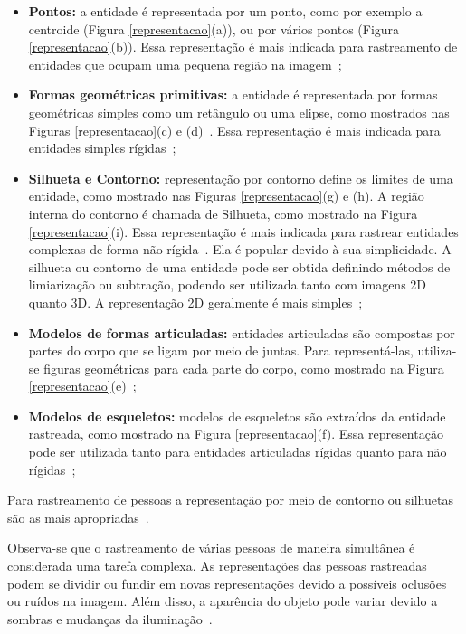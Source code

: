 	\begin{itemize}
		\item \textbf{Pontos:} a entidade é representada por um ponto, como por exemplo a centroide (Figura \ref{representacao}(a)), ou por vários pontos (Figura \ref{representacao}(b)). Essa representação é mais indicada para rastreamento de entidades que ocupam uma pequena região na imagem~\cite{yilmaz};

		\item \textbf{Formas geométricas primitivas:} a entidade é representada por formas geométricas simples como um retângulo ou uma elipse, como mostrados nas Figuras \ref{representacao}(c) e (d)~\cite{comaniciu}. Essa representação é mais indicada para entidades simples rígidas~\cite{yilmaz};

		\item \textbf{Silhueta e Contorno:} representação por contorno define os limites de uma entidade, como mostrado nas Figuras \ref{representacao}(g) e (h). A região interna do contorno é chamada de Silhueta, como mostrado na Figura \ref{representacao}(i). Essa representação é mais indicada para rastrear entidades complexas de forma não rígida~\cite{yilmaz, yilmaz2}. Ela é popular devido à sua simplicidade. A silhueta ou contorno de uma entidade pode ser obtida definindo métodos de limiarização ou subtração, podendo ser utilizada tanto com imagens 2D quanto 3D. A representação 2D geralmente é mais simples~\cite{moeslund};

		\item \textbf{Modelos de formas articuladas:} entidades articuladas são compostas por partes do corpo que se ligam por meio de juntas. Para representá-las, utiliza-se figuras geométricas para cada parte do corpo, como mostrado na Figura \ref{representacao}(e)~\cite{yilmaz};

		\item \textbf{Modelos de esqueletos:} modelos de esqueletos são extraídos da entidade rastreada, como mostrado na Figura \ref{representacao}(f). Essa representação pode ser utilizada tanto para entidades articuladas rígidas quanto para não rígidas~\cite{yilmaz};
	\end{itemize}

	Para rastreamento de pessoas a representação por meio de contorno ou silhuetas são as mais apropriadas~\cite{yilmaz}.

	Observa-se que o rastreamento de várias pessoas de maneira simultânea é considerada uma tarefa complexa. As representações das pessoas rastreadas podem se dividir ou fundir em novas representações devido a possíveis oclusões ou ruídos na imagem. Além disso, a aparência do objeto pode variar devido a sombras e mudanças da iluminação~\cite{moeslund}.

